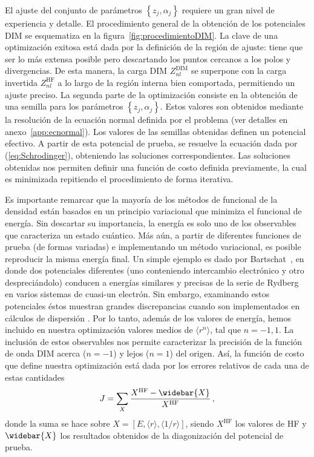 El ajuste del conjunto de parámetros $\left\{z_j,\alpha_j\right\}$ 
requiere un gran nivel de experiencia y detalle. El procedimiento 
general de la obtención de los potenciales DIM se esquematiza en la 
figura~\ref{fig:procedimientoDIM}. La clave de una optimización exitosa 
está dada por la definición de la región de ajuste: tiene que ser lo más 
extensa posible pero descartando los puntos cercanos a los polos y 
divergencias. De esta manera, la carga DIM $Z_{nl}^{\mathrm{DIM}}$ se 
superpone con la carga invertida $Z_{nl}^{\mathrm{HF}}$ a lo largo de 
la región interna bien comportada, permitiendo un ajuste preciso. La 
segunda parte de la optimización consiste en la obtención de una semilla 
para los parámetros $\left\{z_j,\alpha_j\right\}$. Estos valores son 
obtenidos mediante la resolución de la ecuación normal definida por el 
problema (ver detalles en anexo~\ref{app:ecnormal}). Los valores de las 
semillas obtenidas definen un potencial efectivo. A partir de esta 
potencial de prueba, se resuelve la ecuación dada por 
(\ref{eq:Schrodinger}), obteniendo las soluciones correspondientes. Las 
soluciones obtenidas nos permiten definir una función de costo definida 
previamente, la cual es minimizada repitiendo el procedimiento de forma 
iterativa. 

Es importante remarcar que la mayoría de los métodos de funcional de 
la densidad están basados en un principio variacional que minimiza el
funcional de energía. Sin descartar su importancia, la energía es solo
uno de los observables que caracteriza un estado cuántico. Más aún, a 
partir de diferentes funciones de prueba (de formas variadas) e 
implementando un método variacional, es posible reproducir la misma 
energía final. Un simple ejemplo es dado por 
Bartschat~\cite{Albright:93,Bartschat:96}, en donde dos potenciales
diferentes (uno conteniendo intercambio electrónico y otro despreciándolo)
conducen a energías similares y precisas de la serie de Rydberg en 
varios sistemas de cuasi-un electrón. Sin embargo, examinando estos 
potenciales éstos muestran grandes discrepancias cuando son implementados
en cálculos de dispersión \cite{BartschatBray:96}. Por lo tanto, además
de los valores de energía, hemos incluido en nuestra optimización 
valores medios de $\langle r^{n} \rangle$, tal que $n=-1,1$. La inclusión
de estos observables nos permite caracterizar la precisión de la función
de onda DIM acerca ($n=-1$) y lejos ($n=1$) del origen. Así, la función 
de costo que define nuestra optimización está dada por los errores 
relativos de cada una de estas cantidades
\begin{equation}
J=\sum_X \frac{X^{\mathrm{HF}}-\widebar{X}}{X^{\mathrm{HF}}}\,,
\end{equation}
donde la suma se hace sobre $X=\left[E,\langle r \rangle,\langle 1/r \rangle\right]$,
siendo $X^{\mathrm{HF}}$ los valores de HF y $\widebar{X}$ los 
resultados obtenidos de la diagonización del potencial de prueba. 

